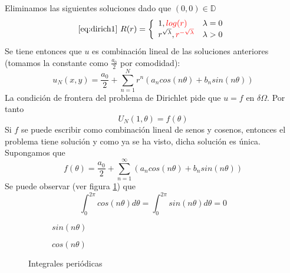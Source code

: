 \noindent Eliminamos las siguientes soluciones dado que $(0,0)\in\mathbb{D}$
\begin{equation*}
\eqref{eq:dirich1}\ R(r) = \left\{
\begin{array}{l l}
1,\color{red}{log(r)} & \lambda=0\\
r^{\sqrt{\lambda}}, \color{red}{r^{-\sqrt{\lambda}}} & \lambda > 0\\
\end{array}
\right.
\end{equation*}
Se tiene entonces que $u$ es combinación lineal de las soluciones anteriores (tomamos la constante como $\frac{a_0}{2}$ por comodidad):
$$u_N(x,y) = \frac{a_0}{2}+\sum_{n=1}^Nr^n(a_ncos(n\theta)+b_nsin(n\theta))$$
La condición de frontera del problema de Dirichlet pide que $u=f$ en $\delta\Omega$. Por tanto
$$U_N(1,\theta) = f(\theta)$$
Si $f$ se puede escribir como combinación lineal de senos y cosenos, entonces el problema tiene solución y como ya se ha visto, dicha solución es única.
Supongamos que
$$f(\theta) = \frac{a_0}{2} + \sum_{n=1}^\infty (a_ncos(n\theta)+b_nsin(n\theta))$$
Se puede observar (ver figura \ref{fig:int-period}) que
\begin{equation*}
\int_0^{2\pi} cos(n\theta)d\theta = \int_0^{2\pi} sin(n\theta)d\theta=0
\end{equation*}
\begin{figure}[ht]
	\centering
	\begin{subfigure}{.5\textwidth}
	\centering
	\caption{$sin(n\theta)$}
	\end{subfigure}%
	\begin{subfigure}{.5\textwidth}
	\centering
	\caption{$cos(n\theta)$}
	\end{subfigure}
	\caption{Integrales periódicas}
	\label{fig:int-period}
\end{figure}
